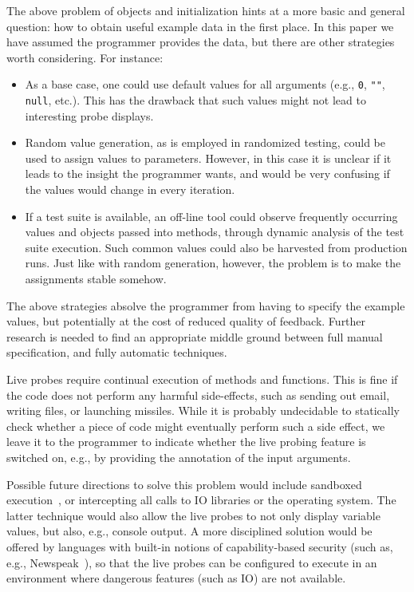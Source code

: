 \documentclass[english,submission]{programming}
\begin{document}
The above problem of objects and initialization hints at a more basic and general question: how to obtain useful example data in the first place. In this paper we have assumed the programmer provides the data, but there are other strategies worth considering. For instance:
\begin{itemize}
  \item As a base case, one could use default values for all arguments (e.g., \lstinline{0}, \lstinline{""}, \lstinline{null}, etc.). This has the drawback that such values might not lead to interesting probe displays. 
  \item Random value generation, as is employed in randomized testing, could be used to assign values to parameters. However, in this case it is unclear if it leads to the insight the programmer wants, and would be very confusing if the values would change in every iteration.
  \item If a test suite is available, an off-line tool could observe frequently occurring values and objects passed into methods, through dynamic analysis of the test suite execution. Such common values could also be harvested from production runs. Just like with random generation, however, the problem is to make the assignments stable somehow. 
\end{itemize}
The above strategies absolve the programmer from having to specify the example values, but potentially at the cost of reduced quality of feedback. Further research is needed to find an appropriate middle ground between full manual specification, and fully automatic techniques.

Live probes require continual execution of methods and functions. This is fine if the code does not perform any harmful side-effects, such as sending out email, writing files, or launching missiles. While it is probably undecidable to statically check whether a piece of code might eventually perform such a side effect, we leave it to the programmer to indicate whether the live probing feature is switched on, e.g., by providing the annotation of the input arguments. 

Possible future directions to solve this problem would include sandboxed execution~\cite{???}, or intercepting all calls to IO libraries or the operating system. The latter technique would also allow the live probes to not only display variable values, but also, e.g., console output. 
A more disciplined solution would be offered by languages with built-in notions of capability-based security (such as, e.g., Newspeak~\cite{Newspeak}), so that the live probes can be configured to execute in an environment where dangerous features (such as IO) are not available.  
\end{document}
